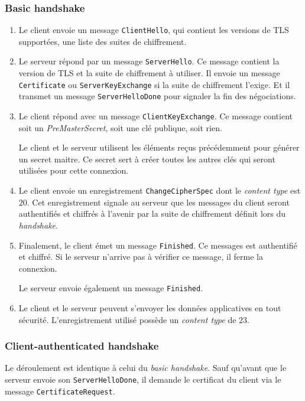 \subsubsection{Basic handshake}
\begin{enumerate}
\item Le client envoie un message \texttt{ClientHello}, qui contient les versions de TLS supportées, une liste des suites de chiffrement.

\item Le serveur répond par un message \texttt{ServerHello}. 
Ce message contient la version de TLS et la suite de chiffrement à utiliser.
Il envoie un message \texttt{Certificate} ou \texttt{ServerKeyExchange} si la suite de chiffrement l'exige.
Et il transmet un message \texttt{ServerHelloDone} pour signaler la fin des négociations.

\item Le client répond avec un message \texttt{ClientKeyExchange}. Ce message contient soit un \textit{PreMasterSecret}, soit une clé publique, soit rien. 

Le client et le serveur utilisent les éléments reçus précédemment pour générer un secret maitre. Ce secret sert à créer toutes les autres clés qui seront utilisées pour cette connexion.

\item Le client envoie un enregistrement \texttt{ChangeCipherSpec} dont le \textit{content type} est $20$. 
Cet enregistrement signale au serveur que les messages du client seront authentifiés et chiffrés à l'avenir par la suite de chiffrement définit lors du \textit{handshake}.

\item Finalement, le client émet un message \texttt{Finished}. 
Ce messages est authentifié et chiffré.
Si le serveur n'arrive pas à vérifier ce message, il ferme la connexion.

Le serveur envoie également un message \texttt{Finished}.

 \item Le client et le serveur peuvent s'envoyer les données applicatives en tout sécurité.
L'enregistrement utilisé possède un \textit{content type} de $23$.
\end{enumerate}
\subsubsection{Client-authenticated handshake}
Le déroulement est identique à celui du \textit{basic handshake}.
Sauf qu'avant que le serveur envoie son \texttt{ServerHelloDone}, il demande le certificat du client via le message \texttt{CertificateRequest}.

